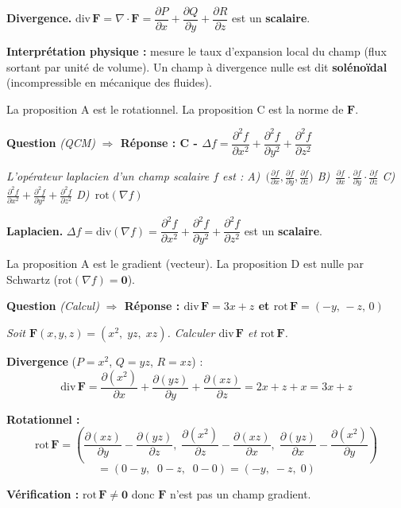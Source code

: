 \documentclass[11pt,a4paper]{article}
\newcounter{qnum}
\newcommand{\qtitre}[2]{%
  \stepcounter{qnum}%
  \medskip\noindent
  \textbf{\color{bleutexte}Question \theqnum}\enspace
  \textit{(#1)}\enspace
  \textcolor{vertok}{\textbf{$\Rightarrow$ Réponse : #2}}
  \par\smallskip
}
\newcommand{\qenonce}[1]{%
  \begin{mdframed}[backgroundcolor=grisbox, linewidth=0pt,
    innerleftmargin=8pt, innerrightmargin=8pt,
    innertopmargin=5pt, innerbottommargin=5pt,
    skipabove=2pt, skipbelow=4pt]
  \small\textit{#1}
  \end{mdframed}
}
\begin{document}
\begin{methodebox}
\textbf{Divergence.} $\text{div}\,\mathbf{F} = \nabla\cdot\mathbf{F} = \dfrac{\partial P}{\partial x}+\dfrac{\partial Q}{\partial y}+\dfrac{\partial R}{\partial z}$ est un \textbf{scalaire}.

\textbf{Interprétation physique :} mesure le taux d'expansion local du champ (flux sortant par unité de volume). Un champ à divergence nulle est dit \textbf{solénoïdal} (incompressible en mécanique des fluides).
\end{methodebox}

La proposition A est le rotationnel. La proposition C est la norme de $\mathbf{F}$.

\qtitre{QCM}{C - $\Delta f = \dfrac{\partial^2 f}{\partial x^2}+\dfrac{\partial^2 f}{\partial y^2}+\dfrac{\partial^2 f}{\partial z^2}$}
\qenonce{L'opérateur laplacien d'un champ scalaire $f$ est :
\quad A)~$\bigl(\frac{\partial f}{\partial x},\frac{\partial f}{\partial y},\frac{\partial f}{\partial z}\bigr)$
\quad B)~$\frac{\partial f}{\partial x}\cdot\frac{\partial f}{\partial y}\cdot\frac{\partial f}{\partial z}$
\quad C)~$\frac{\partial^2 f}{\partial x^2}+\frac{\partial^2 f}{\partial y^2}+\frac{\partial^2 f}{\partial z^2}$
\quad D)~$\text{rot}(\nabla f)$}

\begin{methodebox}
\textbf{Laplacien.} $\Delta f = \text{div}(\nabla f) = \dfrac{\partial^2 f}{\partial x^2}+\dfrac{\partial^2 f}{\partial y^2}+\dfrac{\partial^2 f}{\partial z^2}$ est un \textbf{scalaire}.

La proposition A est le gradient (vecteur). La proposition D est nulle par Schwartz ($\text{rot}(\nabla f) = \mathbf{0}$).
\end{methodebox}

\qtitre{Calcul}{$\text{div}\,\mathbf{F} = 3x+z$ \quad et \quad $\text{rot}\,\mathbf{F} = (-y,\,-z,\,0)$}
\qenonce{Soit $\mathbf{F}(x,y,z) = (x^2,\;yz,\;xz)$. Calculer $\text{div}\,\mathbf{F}$ et $\text{rot}\,\mathbf{F}$.}

\begin{reponsebox}
\textbf{Divergence} ($P = x^2$, $Q = yz$, $R = xz$) :
$$\text{div}\,\mathbf{F} = \frac{\partial(x^2)}{\partial x}+\frac{\partial(yz)}{\partial y}+\frac{\partial(xz)}{\partial z} = 2x + z + x = \boxed{3x+z}$$

\textbf{Rotationnel :}
$$\text{rot}\,\mathbf{F} = \left(\frac{\partial(xz)}{\partial y}-\frac{\partial(yz)}{\partial z},\;\frac{\partial(x^2)}{\partial z}-\frac{\partial(xz)}{\partial x},\;\frac{\partial(yz)}{\partial x}-\frac{\partial(x^2)}{\partial y}\right)$$
$$= (0 - y,\;\; 0 - z,\;\; 0 - 0) = \boxed{(-y,\;-z,\;0)}$$

\textbf{Vérification :} $\text{rot}\,\mathbf{F}\neq\mathbf{0}$ donc $\mathbf{F}$ n'est pas un champ gradient.
\end{reponsebox}
\end{document}
